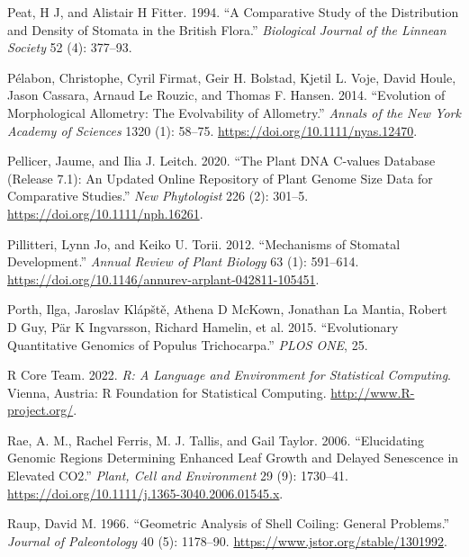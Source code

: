 \documentclass[
  12pt,
]{article}
\newlength{\cslhangindent}
\newlength{\cslentryspacingunit} %
\newenvironment{CSLReferences}[2] %
 {%
  \setlength{\parindent}{0pt}
  \ifodd #1
  \let\oldpar\par
  \def\par{\hangindent=\cslhangindent\oldpar}
  \fi
  \setlength{\parskip}{#2\cslentryspacingunit}
 }%
 {}
\begin{document}
\begin{CSLReferences}{1}{0}
\leavevmode{}%
Peat, H J, and Alistair H Fitter. 1994. {``A Comparative Study of the Distribution and Density of Stomata in the {British} Flora.''} \emph{Biological Journal of the Linnean Society} 52 (4): 377--93.

\leavevmode{}%
Pélabon, Christophe, Cyril Firmat, Geir H. Bolstad, Kjetil L. Voje, David Houle, Jason Cassara, Arnaud Le Rouzic, and Thomas F. Hansen. 2014. {``Evolution of Morphological Allometry: {The} Evolvability of Allometry.''} \emph{Annals of the New York Academy of Sciences} 1320 (1): 58--75. \url{https://doi.org/10.1111/nyas.12470}.

\leavevmode{}%
Pellicer, Jaume, and Ilia J. Leitch. 2020. {``The {Plant} {DNA} {C}‐values Database (Release 7.1): An Updated Online Repository of Plant Genome Size Data for Comparative Studies.''} \emph{New Phytologist} 226 (2): 301--5. \url{https://doi.org/10.1111/nph.16261}.

\leavevmode{}%
Pillitteri, Lynn Jo, and Keiko U. Torii. 2012. {``Mechanisms of {Stomatal} {Development}.''} \emph{Annual Review of Plant Biology} 63 (1): 591--614. \url{https://doi.org/10.1146/annurev-arplant-042811-105451}.

\leavevmode{}%
Porth, Ilga, Jaroslav Klápště, Athena D McKown, Jonathan La Mantia, Robert D Guy, Pär K Ingvarsson, Richard Hamelin, et al. 2015. {``Evolutionary {Quantitative} {Genomics} of {Populus} Trichocarpa.''} \emph{PLOS ONE}, 25.

\leavevmode{}%
R Core Team. 2022. \emph{R: {A} {Language} and {Environment} for {Statistical} {Computing}}. Vienna, Austria: R Foundation for Statistical Computing. \url{http://www.R-project.org/}.

\leavevmode{}%
Rae, A. M., Rachel Ferris, M. J. Tallis, and Gail Taylor. 2006. {``Elucidating Genomic Regions Determining Enhanced Leaf Growth and Delayed Senescence in Elevated {CO2}.''} \emph{Plant, Cell and Environment} 29 (9): 1730--41. \url{https://doi.org/10.1111/j.1365-3040.2006.01545.x}.

\leavevmode{}%
Raup, David M. 1966. {``Geometric {Analysis} of {Shell} {Coiling}: {General} {Problems}.''} \emph{Journal of Paleontology} 40 (5): 1178--90. \url{https://www.jstor.org/stable/1301992}.


\end{CSLReferences}
\end{document}
